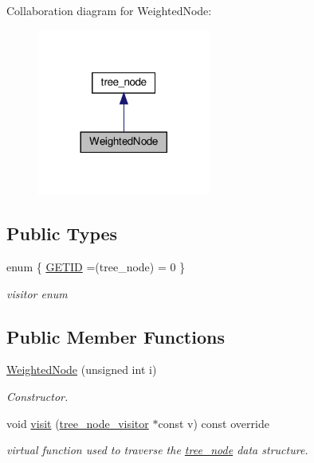 Collaboration diagram for Weighted\+Node\+:
\nopagebreak
\begin{figure}[H]
\begin{center}
\leavevmode
\includegraphics[width=161pt]{db/dde/structWeightedNode__coll__graph}
\end{center}
\end{figure}
\subsection*{Public Types}
\begin{DoxyCompactItemize}
\item 
enum \{ \hyperlink{structWeightedNode_a226ac12f5796ef63d4cf6ba0b5971c76a02aa9554a26c861862e4487c51543758}{G\+E\+T\+ID} =(tree\+\_\+node) = 0
 \}\begin{DoxyCompactList}\small\item\em visitor enum \end{DoxyCompactList}
\end{DoxyCompactItemize}
\subsection*{Public Member Functions}
\begin{DoxyCompactItemize}
\item 
\hyperlink{structWeightedNode_a7eeeb644e4bb4ce880c0ef4c35eda2c5}{Weighted\+Node} (unsigned int i)
\begin{DoxyCompactList}\small\item\em Constructor. \end{DoxyCompactList}\item 
void \hyperlink{structWeightedNode_a6f976feccb640a60f96475a668314fde}{visit} (\hyperlink{classtree__node__visitor}{tree\+\_\+node\+\_\+visitor} $\ast$const v) const override
\begin{DoxyCompactList}\small\item\em virtual function used to traverse the \hyperlink{classtree__node}{tree\+\_\+node} data structure. \end{DoxyCompactList}\end{DoxyCompactItemize}
